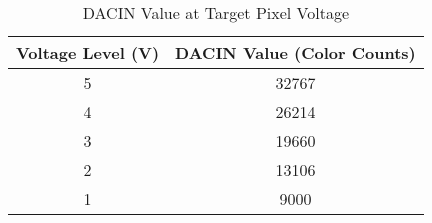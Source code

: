 \begin{table}[h!]
	\centering
	\caption{DACIN Value at Target Pixel Voltage}
	\begin{tabular}{ |c|c| }
		\hline
		\textbf{Voltage Level (V)} & \textbf{DACIN Value (Color Counts)} \\
		\hline
		5                          & 32767                               \\ \hline
		4                          & 26214                               \\ \hline
		3                          & 19660                               \\ \hline
		2                          & 13106                               \\ \hline
		1                          & 9000                                \\ \hline
	\end{tabular}
\end{table}

